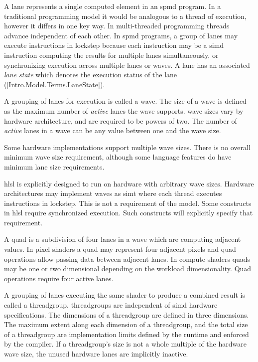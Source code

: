 
\p A \gls{lane} represents a single computed element in an \acrshort{spmd}
program. In a traditional programming model it would be analogous to a thread of
execution, however it differs in one key way. In multi-threaded programming
threads advance independent of each other. In \acrshort{spmd} programs, a group
of \gls{lane}s may execute instructions in lockstep because each instruction may
be a \acrshort{simd} instruction computing the results for multiple \gls{lane}s
simultaneously, or synchronizing execution across multiple \gls{lane}s or
\gls{wave}s. A \gls{lane} has an associated \textit{lane state} which denotes
the execution status of the lane (\ref{Intro.Model.Terms.LaneState}).


\p A grouping of \gls{lane}s for execution is called a \gls{wave}. The size of a
\gls{wave} is defined as the maximum number of \textit{active} \gls{lane}s the
\gls{wave} supports. \gls{wave} sizes vary by hardware architecture, and are required
to be powers of two. The number of \textit{active} \gls{lane}s in a \gls{wave}
can be any value between one and the \gls{wave} size.

\p Some hardware implementations support multiple \gls{wave} sizes. There is no
overall minimum wave size requirement, although some language features do have
minimum \gls{lane} size requirements.

\p \acrshort{hlsl} is explicitly designed to run on hardware with arbitrary
\gls{wave} sizes. Hardware architectures may implement \gls{wave}s as
\acrfull{simt} where each thread executes instructions in lockstep. This is not
a requirement of the model. Some constructs in \acrshort{hlsl} require
synchronized execution. Such constructs will explicitly specify that
requirement.


\p A \gls{quad} is a subdivision of four \gls{lane}s in a \gls{wave} which are
computing adjacent values. In pixel shaders a \gls{quad} may represent four
adjacent pixels and \gls{quad} operations allow passing data between adjacent
\gls{lane}s. In compute shaders quads may be one or two dimensional depending
on the workload dimensionality. Quad operations require four active \gls{lane}s.


\p A grouping of \gls{lane}s executing the same shader to produce a combined
result is called a \gls{threadgroup}. \gls{threadgroup}s are independent of
\acrshort{simd} hardware specifications. The dimensions of a \gls{threadgroup}
are defined in three dimensions. The maximum extent along each dimension of a
\gls{threadgroup}, and the total size of a \gls{threadgroup} are implementation
limits defined by the runtime and enforced by the compiler. If a
\gls{threadgroup}'s size is not a whole multiple of the hardware \gls{wave}
size, the unused hardware \gls{lane}s are implicitly inactive.

